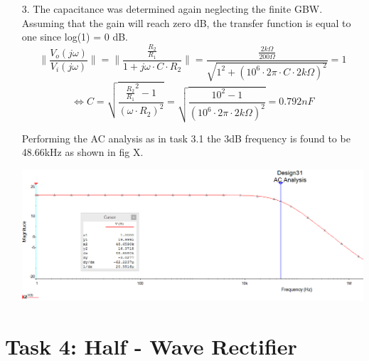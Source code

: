 \documentclass[11pt,a4paper]{article}
\begin{document}
\begin{enumerate}
\begin{minipage}{\linewidth}
    \end{minipage} 
    \pagebreak
  \item[3.]
  The capacitance was determined again neglecting the finite GBW. Assuming that the gain will reach zero dB, the transfer function is equal to one since log(1) = 0 dB. 
  $$\| \frac{V_o(j\omega)}{V_i(j\omega)} \| = \| \frac{\frac{R_2}{R_1}}{1+j\omega \cdot C \cdot R_2} \| = \frac{\frac{2k\Omega}{200\Omega}}{\sqrt{1^2+(10^6 \cdot 2\pi \cdot C \cdot 2k\Omega)^2}} = 1$$
  $$\Leftrightarrow C = \sqrt{\frac{\frac{R_2}{R_1}^2-1}{(\omega \cdot R_2)^2}}  = \sqrt{\frac{10^2-1}{(10^6 \cdot 2\pi \cdot 2k\Omega)^2}} = 0.792nF$$
  
Performing the AC analysis as in task 3.1 the 3dB frequency is found to be 48.66kHz as shown in fig X.\\
\begin{minipage}{\linewidth}
    	\centering       
        \includegraphics[width=14cm]{Task3_3.png}
    \end{minipage}
\end{enumerate}
\pagebreak
\section*{Task 4: Half - Wave Rectifier}
\end{document}
